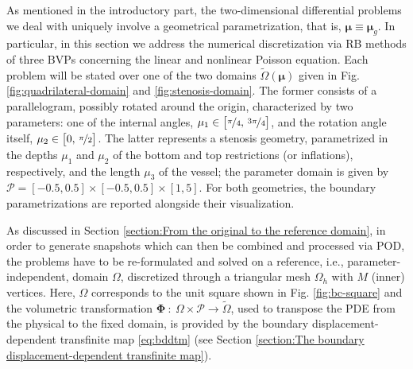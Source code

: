 \documentclass[12pt, a4paper, twoside, openright, notitlepage]{report}
\numberwithin{equation}{chapter}
\theoremstyle{theorem}
\theoremstyle{definition}
\theoremstyle{remark}
\theoremstyle{proposition}
\numberwithin{figure}{chapter}
\newcommand{\wt}[1]{\widetilde{#1}}
\newcommand{\bg}[1]{\boldsymbol{#1}}
\begin{document}
		As mentioned in the introductory part, the two-dimensional differential problems we deal with uniquely involve a geometrical parametrization, that is, $\bg{\mu} \equiv \bg{\mu}_g$. In particular, in this section we address the numerical discretization via RB methods of three BVPs concerning the linear and nonlinear Poisson equation. Each problem will be stated over one of the two domains $\wt{\Omega}(\bg{\mu})$ given in Fig. \ref{fig:quadrilateral-domain} and \ref{fig:stenosis-domain}. The former consists of a parallelogram, possibly rotated around the origin, characterized by two parameters: one of the internal angles, $\mu_1 \in \big[ \nicefrac{\pi}{4}, \, \nicefrac{3 \pi}{4} \big]$, and the rotation angle itself, $\mu_2 \in \big[ 0, \, \nicefrac{\pi}{2} \big]$. The latter represents a stenosis geometry, parametrized in the depths $\mu_1$ and $\mu_2$ of the bottom and top restrictions (or inflations), respectively, and the length $\mu_3$ of the vessel; the parameter domain is given by $\mathcal{P} = [-0.5,0.5] \times [-0.5,0.5] \times [1,5]$. For both geometries, the boundary parametrizations are reported alongside their visualization.
		
		As discussed in Section \ref{section:From the original to the reference domain}, in order to generate snapshots which can then be combined and processed via POD, the problems have to be re-formulated and solved on a reference, i.e., parameter-independent, domain $\Omega$, discretized through a triangular mesh $\Omega_h$ with $M$ (inner) vertices. Here, $\Omega$ corresponds to the unit square shown in Fig. \ref{fig:bc-square} and the volumetric transformation $\bg{\Phi} ~ : ~ \Omega \times \mathcal{P} \rightarrow \wt{\Omega}$, used to transpose the PDE from the physical to the fixed domain, is provided by the boundary displacement-dependent transfinite map \eqref{eq:bddtm} (see Section \ref{section:The boundary displacement-dependent transfinite map}).
		
		\vspace*{-0cm}
		
\end{document}
